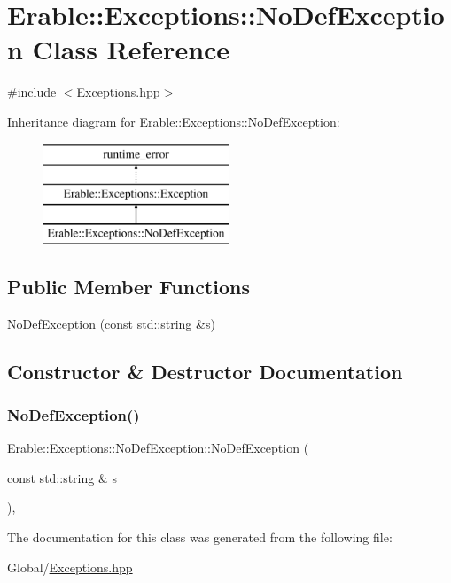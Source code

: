 \hypertarget{class_erable_1_1_exceptions_1_1_no_def_exception}{}\section{Erable\+::Exceptions\+::No\+Def\+Exception Class Reference}
\label{class_erable_1_1_exceptions_1_1_no_def_exception}


{\ttfamily \#include $<$Exceptions.\+hpp$>$}

Inheritance diagram for Erable\+::Exceptions\+::No\+Def\+Exception\+:\begin{figure}[H]
\begin{center}
\leavevmode
\includegraphics[height=3.000000cm]{class_erable_1_1_exceptions_1_1_no_def_exception}
\end{center}
\end{figure}
\subsection*{Public Member Functions}
\begin{DoxyCompactItemize}
\item 
\mbox{\hyperlink{class_erable_1_1_exceptions_1_1_no_def_exception_a2e52a9aee3a3a926d93a8c5a35d8efb6}{No\+Def\+Exception}} (const std\+::string \&s)
\end{DoxyCompactItemize}


\subsection{Constructor \& Destructor Documentation}
\mbox{\label{class_erable_1_1_exceptions_1_1_no_def_exception_a2e52a9aee3a3a926d93a8c5a35d8efb6}} 
\subsubsection{\texorpdfstring{NoDefException()}{NoDefException()}}
{\footnotesize\ttfamily Erable\+::\+Exceptions\+::\+No\+Def\+Exception\+::\+No\+Def\+Exception (\begin{DoxyParamCaption}\item[{const std\+::string \&}]{s }\end{DoxyParamCaption})\hspace{0.3cm}{\ttfamily [inline]}, {\ttfamily [explicit]}}



The documentation for this class was generated from the following file\+:\begin{DoxyCompactItemize}
\item 
Global/\mbox{\hyperlink{_exceptions_8hpp}{Exceptions.\+hpp}}\end{DoxyCompactItemize}

